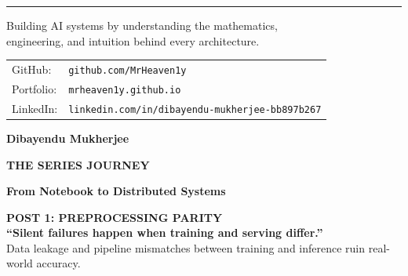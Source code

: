 \documentclass[11pt]{article}
\begin{document}
\begin{center}

\rule{0.6\textwidth}{0.5pt}

\vspace{0.12in}

{\fontsize{11}{13}\selectfont\color{brandgray}
Building AI systems by understanding the mathematics,\\
engineering, and intuition behind every architecture.
}

\vspace{0.12in}

{\fontsize{10}{12}\selectfont\color{brandgray}
\begin{tabular}{@{}l l}
GitHub: & \texttt{github.com/MrHeaven1y} \\
Portfolio: & \texttt{mrheaven1y.github.io} \\
LinkedIn: & \texttt{linkedin.com/in/dibayendu-mukherjee-bb897b267}
\end{tabular}
}

\vspace{0.12in}

{\fontsize{14}{16}\selectfont\color{brandnavy}\textbf{Dibayendu Mukherjee}}

\end{center}

\vspace*{0.2in}

\newpage


\thispagestyle{empty}
\vspace*{0.1in}

\begin{center}

{\fontsize{12}{14}\selectfont\color{brandblue}\textbf{THE SERIES JOURNEY}}

\vspace{0.1in}

{\fontsize{28}{32}\selectfont\color{brandnavy}\bfseries From Notebook to Distributed Systems}

\end{center}

\vspace{0.15in}

\begin{darkbox}[top=8pt, bottom=8pt]
{\small\color{brandblue}\textbf{POST 1: PREPROCESSING PARITY}} \\
{\normalsize\textbf{``Silent failures happen when training and serving differ.''}} \\
{\footnotesize\color{brandlight!80}Data leakage and pipeline mismatches between training and inference ruin real-world accuracy.}
\end{darkbox}
\end{document}
